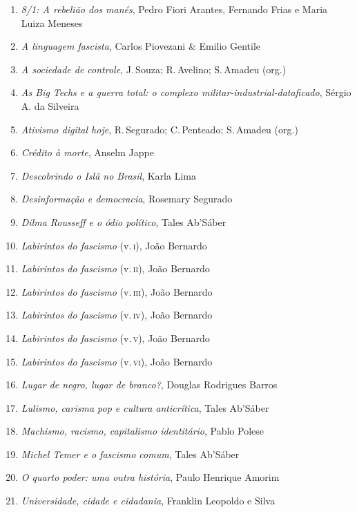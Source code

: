 \begin{enumerate}
\setlength{\topsep}{2pt}
\setlength{\partopsep}{0pt}
\setlength\parskip{4.2pt}
\setlength\itemsep{-1.4mm}
\item \textit{8/1: A rebelião dos manés}, Pedro Fiori Arantes, Fernando Frias e Maria Luiza Meneses
\item \textit{A linguagem fascista}, Carlos Piovezani \& Emilio Gentile
\item \textit{A sociedade de controle}, J.\,Souza; R.\,Avelino; S.\,Amadeu (org.)
\item \textit{As Big Techs e a guerra total: o complexo militar-industrial-dataficado}, Sérgio A. da Silveira
\item \textit{Ativismo digital hoje}, R.\,Segurado; C.\,Penteado; S.\,Amadeu (org.)
\item \textit{Crédito à morte}, Anselm Jappe
\item \textit{Descobrindo o Islã no Brasil}, Karla Lima
\item \textit{Desinformação e democracia}, Rosemary Segurado
\item \textit{Dilma Rousseff e o ódio político}, Tales Ab'Sáber
\item \textit{Labirintos do fascismo} (v.\,\textsc{i}), João Bernardo
\item \textit{Labirintos do fascismo} (v.\,\textsc{ii}), João Bernardo
\item \textit{Labirintos do fascismo} (v.\,\textsc{iii}), João Bernardo
\item \textit{Labirintos do fascismo} (v.\,\textsc{iv}), João Bernardo
\item \textit{Labirintos do fascismo} (v.\,\textsc{v}), João Bernardo
\item \textit{Labirintos do fascismo} (v.\,\textsc{vi}), João Bernardo
\item \textit{Lugar de negro, lugar de branco?}, Douglas Rodrigues Barros
\item \textit{Lulismo, carisma pop e cultura anticrítica}, Tales Ab'Sáber
\item \textit{Machismo, racismo, capitalismo identitário}, Pablo Polese
\item \textit{Michel Temer e o fascismo comum}, Tales Ab'Sáber
\item \textit{O quarto poder: uma outra história}, Paulo Henrique Amorim
\item \textit{Universidade, cidade e cidadania}, Franklin Leopoldo e Silva
\end{enumerate}



